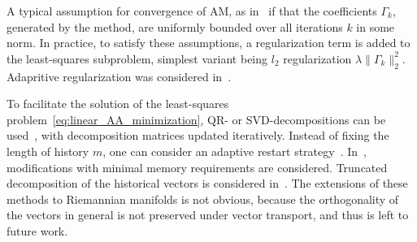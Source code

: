 \documentclass{article} %
\numberwithin{equation}{subsection}
\numberwithin{theorem}{section}
\begin{document}
        A typical assumption for convergence of AM, as in~\cite{toth2015convergence} if that the coefficients $\Gamma_k$, generated by the method, are uniformly bounded over all iterations $k$ in some norm.
        In practice, to satisfy these assumptions, a regularization term is added to the least-squares subproblem, simplest variant being $l_2$ regularization $\lambda \|\Gamma_k\|_2^2$. 
        Adapritive regularization was considered in~\cite{wei2021stochastic,li2023riemannian}.

        To facilitate the solution of the least-squares problem~\eqref{eq:linear_AA_minimization}, QR- or SVD-decompositions can be used~\cite{fang2009two,walker2011anderson}, with decomposition matrices updated iteratively.
        Instead of fixing the length of history $m$, one can consider an adaptive restart strategy~\cite{wei2023convergence}.
        In~\cite{wei2022variant, wei2022class},  modifications with minimal memory requirements are considered.
        Truncated decomposition of the historical vectors is considered in~\cite{tang2024anderson}.
        The extensions of these methods to Riemannian manifolds is not obvious, because the orthogonality of the vectors in general is not preserved under vector transport, and thus is left to future work. 
        
\end{document}
